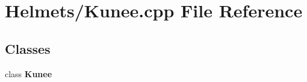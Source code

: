 \section{Helmets/\-Kunee.cpp File Reference}
\label{_kunee_8cpp}
\subsection*{Classes}
\begin{DoxyCompactItemize}
\item 
class {\bf Kunee}
\end{DoxyCompactItemize}
